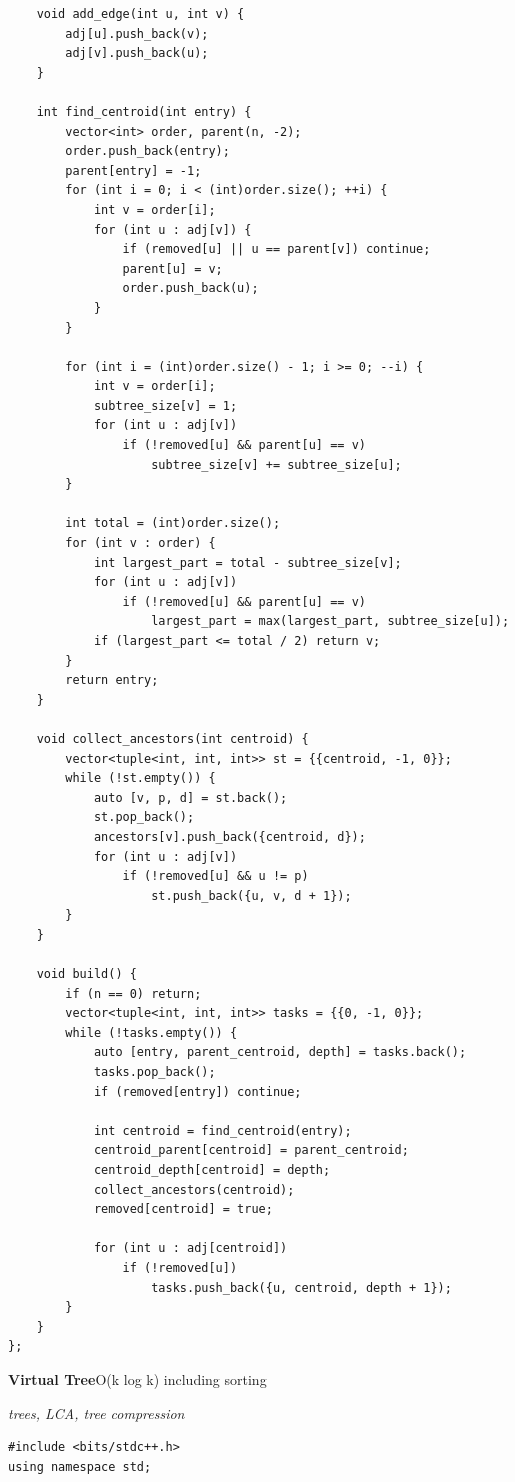 \documentclass[8pt,a4paper,landscape]{article}
\begin{document}
\begin{multicols}{3}
\begin{lstlisting}
    void add_edge(int u, int v) {
        adj[u].push_back(v);
        adj[v].push_back(u);
    }

    int find_centroid(int entry) {
        vector<int> order, parent(n, -2);
        order.push_back(entry);
        parent[entry] = -1;
        for (int i = 0; i < (int)order.size(); ++i) {
            int v = order[i];
            for (int u : adj[v]) {
                if (removed[u] || u == parent[v]) continue;
                parent[u] = v;
                order.push_back(u);
            }
        }

        for (int i = (int)order.size() - 1; i >= 0; --i) {
            int v = order[i];
            subtree_size[v] = 1;
            for (int u : adj[v])
                if (!removed[u] && parent[u] == v)
                    subtree_size[v] += subtree_size[u];
        }

        int total = (int)order.size();
        for (int v : order) {
            int largest_part = total - subtree_size[v];
            for (int u : adj[v])
                if (!removed[u] && parent[u] == v)
                    largest_part = max(largest_part, subtree_size[u]);
            if (largest_part <= total / 2) return v;
        }
        return entry;
    }

    void collect_ancestors(int centroid) {
        vector<tuple<int, int, int>> st = {{centroid, -1, 0}};
        while (!st.empty()) {
            auto [v, p, d] = st.back();
            st.pop_back();
            ancestors[v].push_back({centroid, d});
            for (int u : adj[v])
                if (!removed[u] && u != p)
                    st.push_back({u, v, d + 1});
        }
    }

    void build() {
        if (n == 0) return;
        vector<tuple<int, int, int>> tasks = {{0, -1, 0}};
        while (!tasks.empty()) {
            auto [entry, parent_centroid, depth] = tasks.back();
            tasks.pop_back();
            if (removed[entry]) continue;

            int centroid = find_centroid(entry);
            centroid_parent[centroid] = parent_centroid;
            centroid_depth[centroid] = depth;
            collect_ancestors(centroid);
            removed[centroid] = true;

            for (int u : adj[centroid])
                if (!removed[u])
                    tasks.push_back({u, centroid, depth + 1});
        }
    }
};
\end{lstlisting}
\vspace{1pt}
\textbf{Virtual Tree}\hfill{\scriptsize O(k log k) including sorting}\par
{\scriptsize\itshape trees, LCA, tree compression}\par
\begin{lstlisting}
#include <bits/stdc++.h>
using namespace std;


\end{lstlisting}
\end{multicols}
\end{document}
